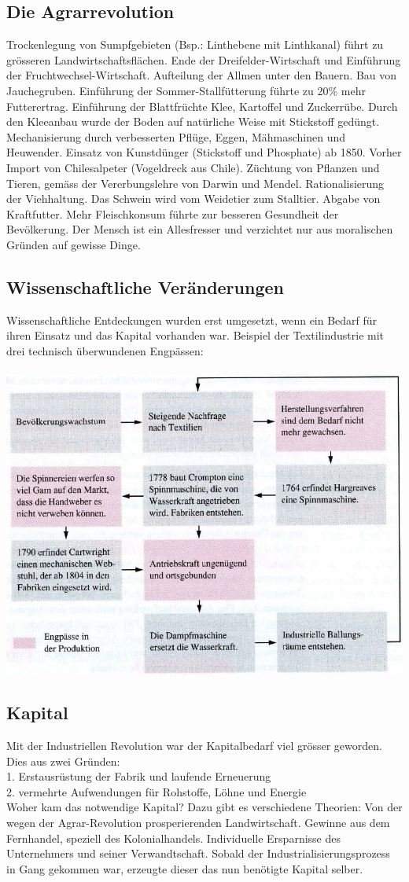 \documentclass[10pt, openright=true]{scrartcl}
\begin{document}
\subsection{Die Agrarrevolution}
Trockenlegung von Sumpfgebieten (Bsp.: Linthebene mit Linthkanal) führt zu grösseren Landwirtschaftsflächen. Ende der Dreifelder-Wirtschaft und Einführung der Fruchtwechsel-Wirtschaft. Aufteilung der Allmen unter den Bauern. Bau von Jauchegruben. Einführung der Sommer-Stallfütterung führte zu 20\% mehr Futterertrag. Einführung der Blattfrüchte Klee, Kartoffel und Zuckerrübe. Durch den Kleeanbau wurde der Boden auf natürliche Weise mit Stickstoff gedüngt. Mechanisierung durch verbesserten Pflüge, Eggen, Mähmaschinen und Heuwender. Einsatz von Kunstdünger (Stickstoff und Phosphate) ab 1850. Vorher Import von Chilesalpeter (Vogeldreck aus Chile). Züchtung von Pflanzen und Tieren, gemäss der Vererbungslehre von Darwin und Mendel. Rationalisierung der Viehhaltung. Das Schwein wird vom Weidetier zum Stalltier. Abgabe von Kraftfutter. Mehr Fleischkonsum führte zur besseren Gesundheit der Bevölkerung. Der Mensch ist ein Allesfresser und verzichtet nur aus moralischen Gründen auf gewisse Dinge.
\subsection{Wissenschaftliche Veränderungen}
Wissenschaftliche Entdeckungen wurden erst umgesetzt, wenn ein Bedarf für ihren Einsatz und das Kapital vorhanden war. Beispiel der Textilindustrie mit drei technisch überwundenen Engpässen:\\ \\
\includegraphics[width=.8\textwidth]{images/textil_1}
\subsection{Kapital}
Mit der Industriellen Revolution war der Kapitalbedarf viel grösser geworden. Dies aus zwei Gründen:\\
1. Erstausrüstung der Fabrik und laufende Erneuerung\\
2. vermehrte Aufwendungen für Rohstoffe, Löhne und Energie\\
Woher kam das notwendige Kapital? Dazu gibt es verschiedene Theorien: Von der wegen der Agrar-Revolution prosperierenden Landwirtschaft. Gewinne aus dem Fernhandel, speziell des Kolonialhandels. Individuelle Ersparnisse des Unternehmers und seiner Verwandtschaft. Sobald der Industrialisierungsprozess in Gang gekommen war, erzeugte dieser das nun benötigte Kapital selber.
\end{document}
